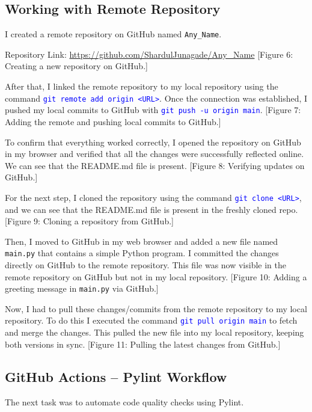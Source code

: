 \documentclass[10pt,a4paper]{report}
\newcommand{\command}[1]{\texttt{\textcolor{blue}{#1}}}
\begin{document}
\subsection{Working with Remote Repository}
I created a remote repository on GitHub named \texttt{Any\_Name}.

Repository Link: \url{https://github.com/ShardulJunagade/Any_Name}
[Figure 6: Creating a new repository on GitHub.]

After that, I linked the remote repository to my local repository using the command \command{git remote add origin <URL>}. Once the connection was established, I pushed my local commits to GitHub with \command{git push -u origin main}.
[Figure 7: Adding the remote and pushing local commits to GitHub.]

To confirm that everything worked correctly, I opened the repository on GitHub in my browser and verified that all the changes were successfully reflected online. We can see that the README.md file is present.
[Figure 8: Verifying updates on GitHub.]

For the next step, I cloned the repository using the command \command{git clone <URL>}, and we can see that the README.md file is present in the freshly cloned repo.
[Figure 9: Cloning a repository from GitHub.]

Then, I moved to GitHub in my web browser and added a new file named \texttt{main.py} that contains a simple Python program. I committed the changes directly on GitHub to the remote repository. This file was now visible in the remote repository on GitHub but not in my local repository.
[Figure 10: Adding a greeting message in \texttt{main.py} via GitHub.]

Now, I had to pull these changes/commits from the remote repository to my local repository. To do this I executed the command \command{git pull origin main} to fetch and merge the changes. This pulled the new file into my local repository, keeping both versions in sync.
[Figure 11: Pulling the latest changes from GitHub.]



\subsection{GitHub Actions -- Pylint Workflow}
The next task was to automate code quality checks using Pylint.
\end{document}
